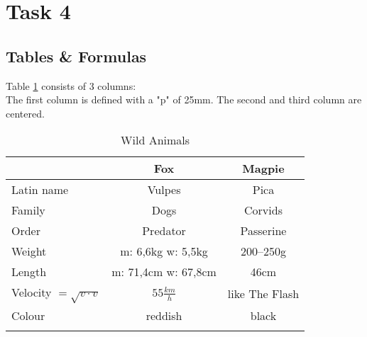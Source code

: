 \section{Task 4}
\subsection{Tables \& Formulas}
Table \ref{tab:ani} consists of 3 columns:\\
The first column is defined with a "p" of 25mm. The second and third column are centered.

\begin{longtable}{p{25mm}|c|c}
& Fox & Magpie\\
\hline
Latin name & Vulpes & Pica\\
\hline
Family & Dogs & Corvids\\
\hline
Order & Predator & Passerine\\
\hline
Weight & m: 6,6kg w: 5,5kg & 200--250g\\
\hline
Length  & m: 71,4cm w: 67,8cm & 46cm\\
\hline
Velocity $ = \sqrt{v\cdot v}$ & $55\frac{km}{h}$ & like The Flash \\
\hline
Colour & reddish & black\\
\hline
\caption{Wild Animals}
\label{tab:ani}
\end{longtable}

